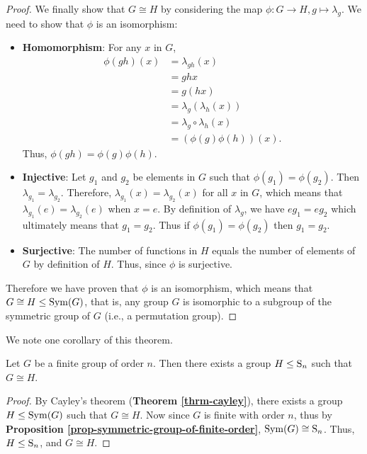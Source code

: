 \begin{proof}
    We finally show that $G \cong H$ by considering the map $\phi: G\to H, g \mapsto \lambda_g$. We need to show that $\phi$ is an isomorphism:
    \begin{itemize}
        \item \textbf{Homomorphism}: For any $x$ in $G$,
            \begin{align*}
                \phi(gh)(x) &= \lambda_{gh}(x)\\
                &= ghx\\
                &= g(hx)\\
                &= \lambda_g\left(\lambda_h(x)\right)\\
                &= \lambda_g\circ\lambda_h(x)\\
                &= (\phi(g)\phi(h))(x).
            \end{align*}
            Thus, $\phi(gh) = \phi(g)\phi(h)$.
        
        \item \textbf{Injective}: Let $g_1$ and $g_2$ be elements in $G$ such that $\phi(g_1) = \phi(g_2)$. Then $\lambda_{g_1} = \lambda_{g_2}$. Therefore, $\lambda_{g_1}(x) = \lambda_{g_2}(x)$ for all $x$ in $G$, which means that $\lambda_{g_1}(e) = \lambda_{g_2}(e)$ when $x = e$. By definition of $\lambda_g$, we have $eg_1 = eg_2$ which ultimately means that $g_1=g_2$. Thus if $\phi(g_1) = \phi(g_2)$ then $g_1=g_2$.
        
        \item \textbf{Surjective}: The number of functions in $H$ equals the number of elements of $G$ by definition of $H$. Thus, since $\phi$ is surjective.
    \end{itemize}
    Therefore we have proven that $\phi$ is an isomorphism, which means that $G \cong H \leq \mathrm{Sym}(G)$, that is, any group $G$ is isomorphic to a subgroup of the symmetric group of $G$ (i.e., a permutation group).
\end{proof}

We note one corollary of this theorem.
\begin{corollary-thrm}
    Let $G$ be a finite group of order $n$. Then there exists a group $H \leq \mathrm{S}_{n}$ such that $G \cong H$.
\end{corollary-thrm}
\begin{proof}
    By Cayley's theorem (\textbf{Theorem \ref{thrm-cayley}}), there exists a group $H \leq \mathrm{Sym}(G)$ such that $G \cong H$. Now since $G$ is finite with order $n$, thus by \textbf{Proposition \ref{prop-symmetric-group-of-finite-order}}, $\mathrm{Sym}(G) \cong \mathrm{S}_{n}$. Thus, $H \leq \mathrm{S}_{n}$, and $G \cong H$.
\end{proof}


